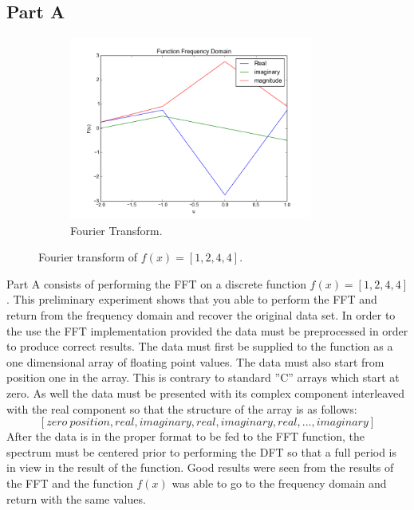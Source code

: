 \documentclass[letter]{article}
\begin{document}
\subsection{Part A}
\begin{figure}[hbtp]
  \centering
  \begin{subfigure}{8cm}
    \includegraphics[width=8cm]{images/function_f.png}
    \caption{Fourier Transform.}
  \end{subfigure}
  \caption{Fourier transform of $f(x)=[1,2,4,4]$.}
  \label{fig:ft_f}
\end{figure}
Part A consists of performing the FFT on a discrete function $f(x) = [1, 2, 4, 4]$. This preliminary experiment shows that you able to perform the FFT and return from the frequency domain and recover the original data set. In order to the use the FFT implementation provided the data must be preprocessed in order to produce correct results. The data must first be supplied to the function as a one dimensional array of floating point values. The data must also start from position one in the array. This is contrary to standard ''C'' arrays which start at zero. As well the data must be presented with its complex component interleaved with the real component so that the structure of the array is as follows: $$[zero~position, real, imaginary, real, imaginary, real, ..., imaginary]$$ After the data is in the proper format to be fed to the FFT function, the spectrum must be centered prior to performing the DFT so that a full period is in view in the result of the function. Good results were seen from the results of the FFT and the function $f(x)$ was able to go to the frequency domain and return with the same values.
\end{document}
